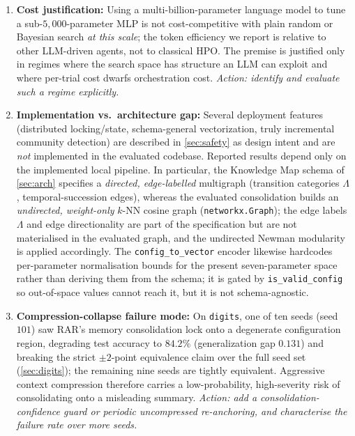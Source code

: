 \documentclass[conference]{IEEEtran}
\begin{document}
\begin{enumerate}[label=\textbf{L\arabic*.},leftmargin=2.2em,itemsep=3pt]
  \item \textbf{Cost justification:} Using a multi-billion-parameter language model to tune a sub-$5{,}000$-parameter MLP is not cost-competitive with plain random or Bayesian search \emph{at this scale}; the token efficiency we report is relative to other LLM-driven agents, not to classical HPO. The premise is justified only in regimes where the search space has structure an LLM can exploit and where per-trial cost dwarfs orchestration cost. \textit{Action: identify and evaluate such a regime explicitly.}
  \item \textbf{Implementation vs.\ architecture gap:} Several deployment features (distributed locking/state, schema-general vectorization, truly incremental community detection) are described in \cref{sec:safety} as design intent and are \emph{not} implemented in the evaluated codebase. Reported results depend only on the implemented local pipeline. In particular, the Knowledge Map schema of \cref{sec:arch} specifies a \emph{directed, edge-labelled} multigraph (transition categories $\Lambda$, temporal-succession edges), whereas the evaluated consolidation builds an \emph{undirected, weight-only} $k$-NN cosine graph (\texttt{networkx.Graph}); the edge labels $\Lambda$ and edge directionality are part of the specification but are not materialised in the evaluated graph, and the undirected Newman modularity is applied accordingly. The \texttt{config\_to\_vector} encoder likewise hardcodes per-parameter normalisation bounds for the present seven-parameter space rather than deriving them from the schema; it is gated by \texttt{is\_valid\_config} so out-of-space values cannot reach it, but it is not schema-agnostic.
  \item \textbf{Compression-collapse failure mode:} On \texttt{digits}, one of ten seeds (seed $101$) saw RAR's memory consolidation lock onto a degenerate configuration region, degrading test accuracy to $84.2\%$ (generalization gap $0.131$) and breaking the strict $\pm 2$-point equivalence claim over the full seed set (\cref{sec:digits}); the remaining nine seeds are tightly equivalent. Aggressive context compression therefore carries a low-probability, high-severity risk of consolidating onto a misleading summary. \textit{Action: add a consolidation-confidence guard or periodic uncompressed re-anchoring, and characterise the failure rate over more seeds.}
\end{enumerate}

\end{document}
